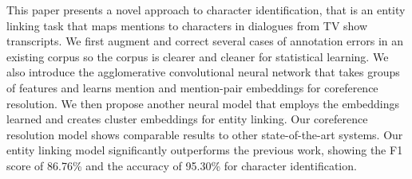This paper presents a novel approach to character identification, that is an entity linking task that maps mentions to characters in dialogues from TV show transcripts. We first augment and correct several cases of annotation errors in an existing corpus so the corpus is clearer and cleaner for statistical learning. We also introduce the agglomerative convolutional neural network that takes groups of features and learns mention and mention-pair embeddings for coreference resolution. We then propose another neural model that employs the embeddings learned and creates cluster embeddings for entity linking. Our coreference resolution model shows comparable results to other state-of-the-art systems. Our entity linking model significantly outperforms the previous work, showing the F1 score of 86.76\% and the accuracy of 95.30\% for character identification.
